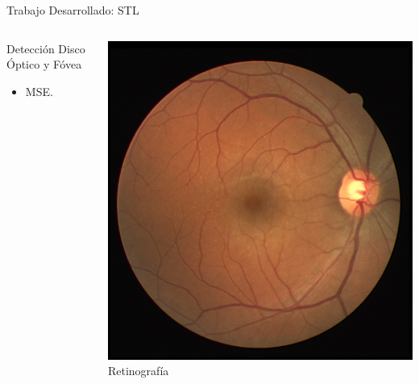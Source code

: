 \documentclass[xcolor=dvipsnames,table]{beamer}
\begin{document}
\begin{frame}{Trabajo Desarrollado: STL}
\begin{columns}[T]
\begin{block}{Detección Disco Óptico y Fóvea}
\begin{itemize}
				\item MSE.
			\end{itemize}
		\end{block}
\begin{minipage}[t]{0.35\textwidth}
	\centering
	\includegraphics[width=\textwidth]{my_images/ML/36_training.jpg}\\[1ex]
	{\small Retinografía}
\end{minipage}\hfill
\begin{minipage}[t]{0.35\textwidth}
	\centering

\end{minipage}
\end{columns}
\end{frame}
\end{document}
